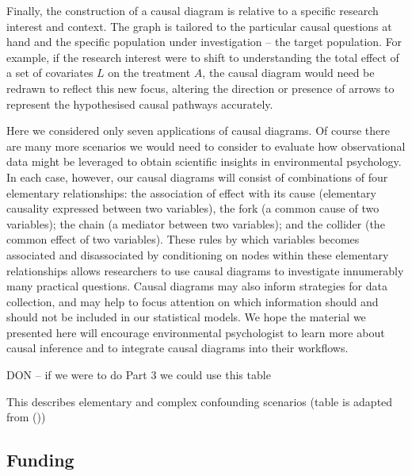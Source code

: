 \documentclass[
  singlecolumn]{article}
\begin{document}
Finally, the construction of a causal diagram is relative to a specific
research interest and context. The graph is tailored to the particular
causal questions at hand and the specific population under investigation
-- the target population. For example, if the research interest were to
shift to understanding the total effect of a set of covariates \(L\) on
the treatment \(A\), the causal diagram would need be redrawn to reflect
this new focus, altering the direction or presence of arrows to
represent the hypothesised causal pathways accurately.

Here we considered only seven applications of causal diagrams. Of course
there are many more scenarios we would need to consider to evaluate how
observational data might be leveraged to obtain scientific insights in
environmental psychology. In each case, however, our causal diagrams
will consist of combinations of four elementary relationships: the
association of effect with its cause (elementary causality expressed
between two variables), the fork (a common cause of two variables); the
chain (a mediator between two variables); and the collider (the common
effect of two variables). These rules by which variables becomes
associated and disassociated by conditioning on nodes within these
elementary relationships allows researchers to use causal diagrams to
investigate innumerably many practical questions. Causal diagrams may
also inform strategies for data collection, and may help to focus
attention on which information should and should not be included in our
statistical models. We hope the material we presented here will
encourage environmental psychologist to learn more about causal
inference and to integrate causal diagrams into their workflows.

\newpage{}

DON -- if we were to do Part 3 we could use this table

\begin{table}

\caption{\label{tbl-04}This describes elementary and complex confounding
scenarios (table is adapted from ())}

\centering{

\terminologyelconfoundersexperiments

}

\end{table}%

\newpage{}

\subsection{Funding}\label{funding}
\end{document}

